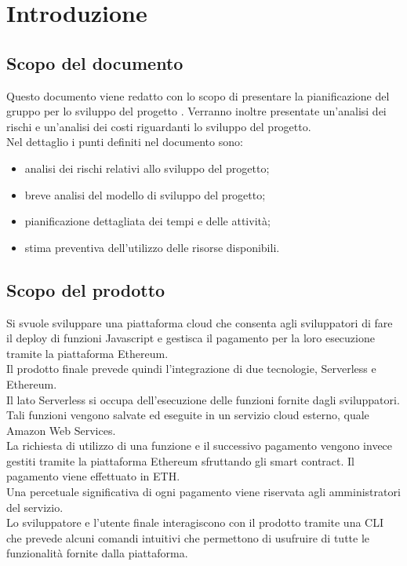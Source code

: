\section{Introduzione}
\subsection{Scopo del documento}
Questo documento viene redatto con lo scopo di presentare la pianificazione del gruppo \Gruppo{} per lo sviluppo del progetto \NomeProgetto{}. Verranno inoltre presentate un'analisi dei rischi e un'analisi dei costi riguardanti lo sviluppo del progetto.\\
Nel dettaglio i punti definiti nel documento sono:
\begin{itemize}
	\item analisi dei rischi relativi allo sviluppo del progetto;
	\item breve analisi del modello di sviluppo del progetto;
	\item pianificazione dettagliata dei tempi e delle attività;
	\item stima preventiva dell'utilizzo delle risorse disponibili.
\end{itemize}
\subsection{Scopo del prodotto}
Si svuole sviluppare una piattaforma cloud che consenta agli sviluppatori di fare il deploy di funzioni Javascript e gestisca il pagamento per la loro esecuzione tramite la piattaforma Ethereum.\\
Il prodotto finale prevede quindi l'integrazione di due tecnologie, Serverless e Ethereum.\\
Il lato Serverless si occupa dell'esecuzione delle funzioni fornite dagli sviluppatori. Tali funzioni vengono salvate ed eseguite in un servizio cloud esterno, quale Amazon Web Services.\\
La richiesta di utilizzo di una funzione e il successivo pagamento vengono invece gestiti tramite la piattaforma Ethereum sfruttando gli smart contract. Il pagamento viene effettuato in ETH.\\
Una percetuale significativa di ogni pagamento viene riservata agli amministratori del servizio.\\
Lo sviluppatore e l'utente finale interagiscono con il prodotto tramite una CLI che prevede alcuni comandi intuitivi che permettono di usufruire di tutte le funzionalità fornite dalla piattaforma.
